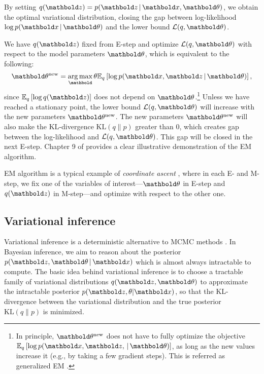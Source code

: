  By setting $q(\mbz) = p(\mbz \g \mbx, \mb\theta)$, we obtain the optimal variational distribution, closing the gap between log-likelihood $\log p(\mbx \g \mb\theta)$ and the lower bound $\cL(q, \mb\theta)$. 

 We have $q(\mbz)$ fixed from E-step and optimize $\cL(q, \mb\theta)$ with respect to the model parameters $\mb\theta$, which is equivalent to the following:
\begin{equation*}
\mb\theta^\new = \argmax_\mb\theta \EE{q}{\log p(\mbx, \mbz \g \mb\theta)},
\end{equation*}
since $\EE{q}{\log q(\mbz)}$ does not depend on $\mb\theta$.\footnote{In principle, $\mb\theta^\new$ does not have to fully optimize the objective $\EE{q}{\log p(\mbx, \mbz, \g \mb\theta)}$, as long as the new values increase it (e.g., by taking a few gradient steps). This is referred as generalized \gls{EM} \citep{neal1998view}.} Unless we have reached a stationary point, the lower bound $\cL(q, \mb\theta)$ will increase with the new parameters $\mb\theta^\new$. The new parameters $\mb\theta^\new$ will also make the \gls{KL}-divergence $\textrm{KL}(q \| p)$ greater than $0$, which creates gap between the log-likelihood and $\cL(q, \mb{\theta})$. This gap will be closed in the next E-step. Chapter 9 of \citet{Bishop:2006:PRM:1162264} provides a clear illustrative demonstration of the \gls{EM} algorithm.  

\gls{EM} algorithm is a typical example of \textit{coordinate ascent} \citep{bertsekas1999nonlinear}, where in each E- and M-step, we fix one of the variables of interest---$\mb\theta$ in E-step and $q(\mbz)$ in M-step---and optimize with respect to the other one.


\subsection{Variational inference}\label{chpt:background:sec:vi}

Variational inference is a deterministic alternative to \gls{MCMC} methods \citep{jordan1999introduction,wainwright2008graphical,blei2016variational}. In Bayesian inference, we aim to reason about the posterior $p(\mbz, \mb\theta \g \mbx)$ which is almost always intractable to compute. The basic idea behind variational inference is to choose a tractable family of variational distributions $q(\mbz, \mb\theta)$ to approximate the intractable posterior $p(\mbz, \theta | \mbx)$, so that the \gls{KL}-divergence between the variational distribution and the true posterior $\textrm{KL}(q \| p)$ is minimized.

